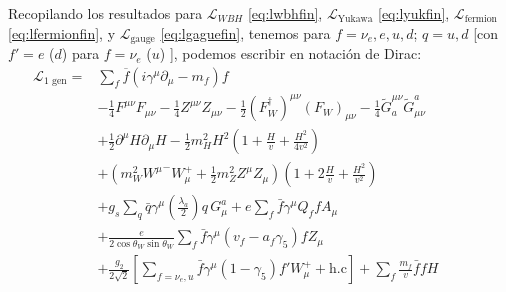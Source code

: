 \begin{frame}
Recopilando los resultados para $\mathcal{L}_{WBH}$ \eqref{eq:lwbhfin}, $\mathcal{L}_{\text{Yukawa}}$ \eqref{eq:lyukfin}, $\mathcal{L}_{\text{fermion}}$ \eqref{eq:lfermionfin}, y $\mathcal{L}_{\text{gauge}}$ \eqref{eq:lgaguefin}, tenemos  para $f=\nu_e,e,u,d$; $q=u,d$ [con $f'=e$ ($d$) para $f=\nu_e$ ($u$) ], podemos escribir en notación de Dirac:
\begin{align}
  \mathcal{L}_{\text{1 gen}}=&\sum_f \overline{f}\left(i\gamma^\mu\partial_\mu-m_f\right)f\nonumber\\
&-\tfrac{1}{4}F^{\mu\nu} F_{\mu\nu}-\tfrac{1}{4}Z^{\mu\nu} Z_{\mu\nu}-\tfrac{1}{2}(F_W^\dagger)^{\mu\nu} (F_W)_{\mu\nu}
- \tfrac{1}{4}\widetilde{G}^{\mu\nu}_a \widetilde{G}_{\mu\nu}^a\nonumber\\
&+\tfrac{1}{2}\partial^\mu H\partial_\mu H
-\frac{1}{2}m_H^2H^2\left(1+\frac{H}{v}+\frac{H^2}{4v^2}\right)\nonumber\\
&+\left(m_W^2{W^\mu}^-W_\mu^++\frac{1}{2}m_Z^2Z^\mu Z_\mu\right)\left(1+2\frac{H}{v}+\frac{H^2}{v^2}\right)\nonumber\\
&+g_s\sum_q\bar{q}\gamma^\mu\left(\frac{\lambda_a}{2}\right)q\,G_\mu^a+e\sum_f \bar{f}\gamma^\mu Q_f f A_\mu\nonumber\\
&+\frac{e}{2\cos\theta_W\sin\theta_W}\sum_{f}\bar{f}\gamma^\mu(v_f-a_f\gamma_5)f Z_\mu\nonumber\\
&+\frac{g_2}{2\sqrt{2}}\left[\sum_{f=\nu_e,u}\bar{f}\gamma^\mu(1-\gamma_5)f' W_\mu^++\text{h.c}\right]
+\sum_f \frac{m_f}{v} \bar{f}f H\nonumber\\
&\phantom{- \frac{1}{4}\left(g_s\widetilde{G}^{\mu\nu}_af_{a d e}G^d_\mu G^e_\nu
    +g_sf^{a b c}G_b^\mu G_c^\nu\widetilde{G}_{\mu\nu}^a
    +g_s^2f^{a b c}f_{a d e}G_b^\mu G_c^\nu G^d_\mu G^e_\nu\right)\,.}\nonumber
\end{align}
\end{frame}
